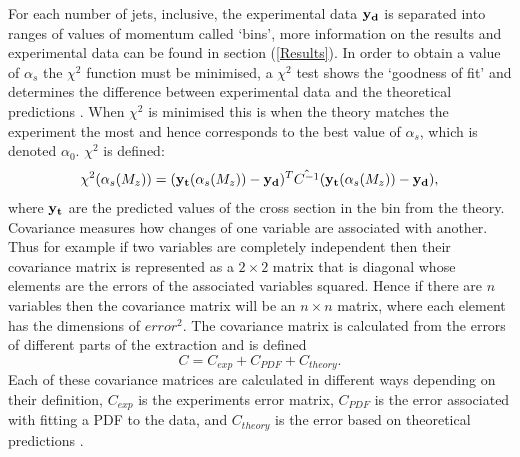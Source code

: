 \documentclass[12pt, onecolumn]{revtex4}    %
\begin{document}
For each number of jets, inclusive, the experimental data ${\bold{y_d}}$ is separated into ranges of values of momentum called `bins', more information on the results and experimental data can be found in section (\ref{Results}). In order to obtain a value of ${\alpha_s}$ the ${\chi^2}$ function must be minimised, a ${\chi^2}$ test shows the `goodness of fit' and determines the difference between experimental data and the theoretical predictions \cite{STAT}. When ${\chi^2}$ is minimised this is when the theory matches the experiment the most and hence corresponds to the best value of ${\alpha_s}$, which is denoted ${\alpha_0}$. ${\chi^2}$  is defined:  \begin{equation} \chi^2(\alpha_s(M_z)) = (\bold{y_t}(\alpha_s(M_z))-\bold{y_d})^T\hat{C^{-1}}(\bold{y_t}(\alpha_s(M_z))-\bold{y_d}), \end{equation} where ${\bold{y_t}}$ are the predicted values of the cross section in the bin from the theory. Covariance measures how changes of one variable are associated with another. Thus for example if two variables are completely independent then their covariance matrix is represented as a ${2\times2}$ matrix that is diagonal whose elements are the errors of the associated variables squared. Hence if there are ${n}$ variables then the covariance matrix will be an ${n\times n}$ matrix, where each element has the dimensions of ${error^2}$. The covariance matrix is calculated from the errors of different parts of the extraction and is defined \begin{equation} C = C_{exp} + C_{PDF} + C_{theory}. \end{equation} Each of these covariance matrices are calculated in different ways depending on their definition, ${C_{exp}}$ is the experiments error matrix, ${C_{PDF}}$ is the error associated with fitting a PDF to the data, and ${C_{theory}}$ is the error based on theoretical predictions \cite{DMP}. 
\end{document}
